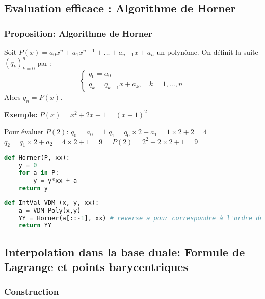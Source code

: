 \documentclass[oneside]{book}
\begin{document}
\subsection{Evaluation efficace : Algorithme de Horner}

\subsubsection{Proposition: Algorithme de Horner}

\begin{proposition}
Soit $P(x) = a_0 x^n + a_1 x^{n-1} + \dots + a_{n-1} x + a_n$ un polynôme.
On définit la suite $(q_k)_{k=0}^n$ par :
\[
\begin{cases}
q_0 = a_0 \\
q_k = q_{k-1} x + a_k, \quad k=1, \dots, n
\end{cases}
\]
Alors $q_n = P(x)$.
\end{proposition}

\textbf{Exemple: } $P(x) = x^2 + 2x + 1 = (x+1)^2$

Pour évaluer $P(2)$:
$q_0 = a_0 = 1$
$q_1 = q_0 \times 2 + a_1 = 1 \times 2 + 2 = 4$
$q_2 = q_1 \times 2 + a_2 = 4 \times 2 + 1 = 9 = P(2) = 2^2 + 2 \times 2 + 1 = 9$

\begin{lstlisting}[language=Python]
def Horner(P, xx):
    y = 0
    for a in P:
        y = y*xx + a
    return y
\end{lstlisting}

\begin{lstlisting}[language=Python]
def IntVal_VDM (x, y, xx):
    a = VDM_Poly(x,y)
    YY = Horner(a[::-1], xx) # reverse a pour correspondre à l'ordre des coefficients dans Horner
    return YY
\end{lstlisting}


\subsection{Interpolation dans la base duale: Formule de Lagrange et points barycentriques}

\subsubsection{Construction}
\end{document}
